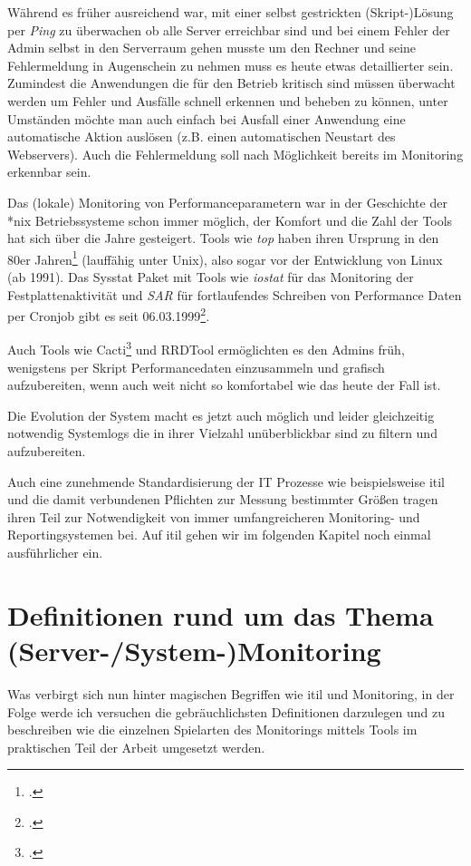 \documentclass[12pt,a4paper,parskip,listof=totoc,bibliography=totoc]{scrreprt}
\begin{document}
	Während es früher ausreichend war, mit einer selbst gestrickten (Skript-)Lösung per \textit{Ping} zu überwachen ob alle Server erreichbar sind und bei einem Fehler der Admin selbst in den Serverraum gehen musste um den Rechner und seine Fehlermeldung in Augenschein zu nehmen muss es heute etwas detaillierter sein. Zumindest die Anwendungen die für den Betrieb kritisch sind müssen überwacht werden um Fehler und Ausfälle schnell erkennen und beheben zu können, unter Umständen möchte man auch einfach bei Ausfall einer Anwendung eine automatische Aktion auslösen (z.B. einen automatischen Neustart des Webservers). Auch die Fehlermeldung soll nach Möglichkeit bereits im Monitoring erkennbar sein.
	
	Das (lokale) Monitoring von Performanceparametern war in der Geschichte der *nix Betriebssysteme schon immer möglich, der Komfort und die Zahl der Tools hat sich über die Jahre gesteigert. Tools wie \textit{top} haben ihren Ursprung in den 80er Jahren\footcite{top} (lauffähig unter Unix), also sogar vor der Entwicklung von Linux (ab 1991). Das Sysstat Paket mit Tools wie \textit{iostat} für das Monitoring der Festplattenaktivität und \textit{SAR} für fortlaufendes Schreiben von Performance Daten per Cronjob gibt es seit 06.03.1999\footcite{sysstatchangelog}.
	
	Auch Tools wie Cacti\footcite{cacti} und RRDTool ermöglichten es den Admins früh, wenigstens per Skript Performancedaten einzusammeln und grafisch aufzubereiten, wenn auch weit nicht so komfortabel wie das heute der Fall ist.
	
	Die Evolution der System macht es jetzt auch möglich und leider gleichzeitig notwendig Systemlogs die in ihrer Vielzahl unüberblickbar sind zu filtern und aufzubereiten.
	
	Auch eine zunehmende Standardisierung der IT Prozesse wie beispielsweise \acrfull{itil} und die damit verbundenen Pflichten zur Messung bestimmter Größen tragen ihren Teil zur Notwendigkeit von immer umfangreicheren Monitoring- und Reportingsystemen bei. Auf \acrshort{itil} gehen wir im folgenden Kapitel noch einmal ausführlicher ein.
	
	\section{Definitionen rund um das Thema (Server-/System-)Monitoring}
	Was verbirgt sich nun hinter magischen Begriffen wie \acrshort{itil} und Monitoring, in der Folge werde ich versuchen die gebräuchlichsten Definitionen darzulegen und zu beschreiben wie die einzelnen Spielarten des Monitorings mittels Tools im praktischen Teil der Arbeit umgesetzt werden.
\end{document}
